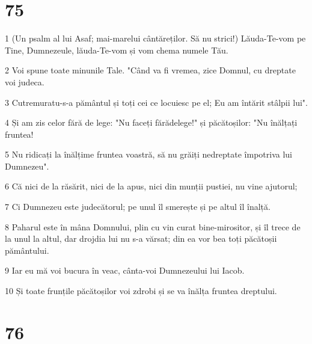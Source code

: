 \chapter{75}

\par 1 (Un psalm al lui Asaf; mai-marelui cântăreților. Să nu strici!) Lăuda-Te-vom pe Tine, Dumnezeule, lăuda-Te-vom și vom chema numele Tău.
\par 2 Voi spune toate minunile Tale. "Când va fi vremea, zice Domnul, cu dreptate voi judeca.
\par 3 Cutremuratu-s-a pământul și toți cei ce locuiesc pe el; Eu am întărit stâlpii lui".
\par 4 Și am zis celor fără de lege: "Nu faceți fărădelege!" și păcătoșilor: "Nu înălțați fruntea!
\par 5 Nu ridicați la înălțime fruntea voastră, să nu grăiți nedreptate împotriva lui Dumnezeu".
\par 6 Că nici de la răsărit, nici de la apus, nici din munții pustiei, nu vine ajutorul;
\par 7 Ci Dumnezeu este judecătorul; pe unul îl smerește și pe altul îl înalță.
\par 8 Paharul este în mâna Domnului, plin cu vin curat bine-mirositor, și îl trece de la unul la altul, dar drojdia lui nu s-a vărsat; din ea vor bea toți păcătoșii pământului.
\par 9 Iar eu mă voi bucura în veac, cânta-voi Dumnezeului lui Iacob.
\par 10 Și toate frunțile păcătoșilor voi zdrobi și se va înălța fruntea dreptului.

\chapter{76}


